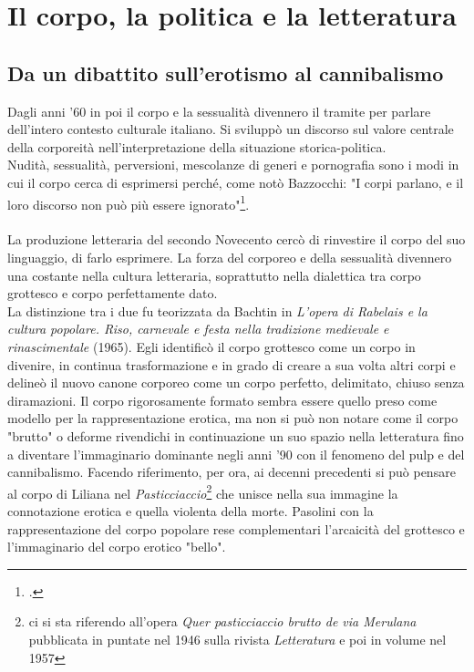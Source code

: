 \section{Il corpo, la politica e la letteratura}
\subsection{Da un dibattito sull'erotismo al cannibalismo}
Dagli anni '60 in poi il corpo e la sessualità divennero il tramite per parlare dell'intero contesto culturale italiano.
Si sviluppò un discorso sul valore centrale della corporeità nell'interpretazione della situazione storica-politica.
\\Nudità, sessualità, perversioni, mescolanze di generi e pornografia sono i modi in cui il corpo cerca di esprimersi perché, come notò Bazzocchi: "I corpi parlano, e il loro discorso non può più essere ignorato"\footcite{Bazzocchi}.

\paragraph{}La produzione letteraria del secondo Novecento cercò di rinvestire il corpo del suo linguaggio, di farlo esprimere.
La forza del corporeo e della sessualità divennero una costante nella cultura letteraria, soprattutto nella dialettica tra corpo grottesco e corpo perfettamente dato.
\\La distinzione tra i due fu teorizzata da Bachtin in \textit{L'opera di Rabelais e la cultura popolare. Riso, carnevale e festa nella tradizione medievale e rinascimentale} (1965).
Egli identificò il corpo grottesco come un corpo in divenire, in continua trasformazione e in grado di creare a sua volta altri corpi e delineò il nuovo canone corporeo come un corpo perfetto, delimitato, chiuso senza diramazioni.
Il corpo rigorosamente formato sembra essere quello preso come modello per la rappresentazione erotica, ma non si può non notare come il corpo "brutto" o deforme rivendichi in continuazione un suo spazio nella letteratura fino a diventare l'immaginario dominante negli anni '90 con il fenomeno del pulp e del cannibalismo.
Facendo riferimento, per ora, ai decenni precedenti si può pensare al corpo di Liliana nel \textit{Pasticciaccio}\footnote{ci si sta riferendo all'opera \textit{Quer pasticciaccio brutto de via Merulana} pubblicata in puntate nel 1946 sulla rivista \textit{Letteratura} e poi in volume nel 1957} che unisce nella sua immagine la connotazione erotica e quella violenta della morte.
Pasolini con la rappresentazione del corpo popolare rese complementari l'arcaicità del grottesco e l'immaginario del corpo erotico "bello".

